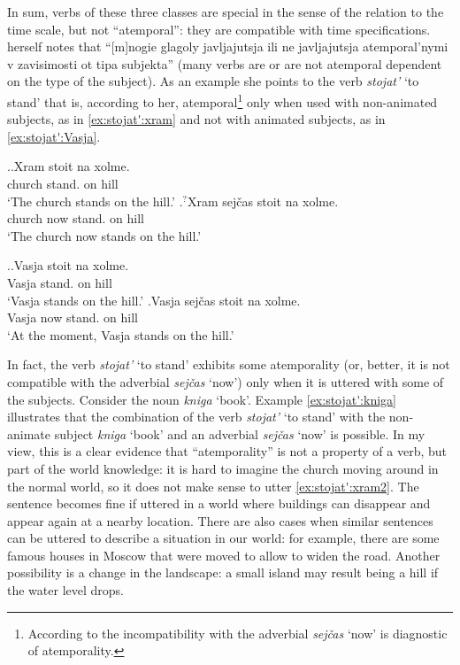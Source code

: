 In sum, verbs of these three classes are special in the sense of the relation to the time scale, but not ``atemporal'': they are compatible with time specifications. \citet[132]{Paducheva:96} herself notes that ``[m]nogie glagoly javljajutsja ili ne javljajutsja atemporal'nymi v zavisimosti ot tipa subjekta'' (many verbs are or are not atemporal dependent on the type of the subject). As an example she points to the verb \textit{stojat'} `to stand' that is, according to her, atemporal\footnote{According to \citet{Paducheva:96} the incompatibility with the adverbial \textit{sej\v{c}as} `now' is diagnostic of atemporality.} only when used with non-animated subjects, as in \ref{ex:stojat':xram} and not with animated subjects, as in \ref{ex:stojat':Vasja}.

\ex.\label{ex:stojat':xram}\ag.Xram stoit na xolme.\\
church stand. on hill\\
\vspace{0.5em}
`The church stands on the hill.'
\bg.\label{ex:stojat':xram2}$^?$Xram sej\v{c}as stoit na xolme.\\
church now stand. on hill\\
\vspace{0.5em}
`The church now stands on the hill.'

\ex.\label{ex:stojat':Vasja}\ag.Vasja stoit na xolme.\\
Vasja stand. on hill\\
\vspace{0.5em}
`Vasja stands on the hill.'
\bg.Vasja sej\v{c}as stoit na xolme.\\
Vasja now stand. on hill\\
\vspace{0.5em}
`At the moment, Vasja stands on the hill.'

In fact, the verb \textit{stojat'} `to stand' exhibits some atemporality (or, better, it is not compatible with the adverbial \textit{sej\v{c}as} `now') only when it is uttered with some of the subjects. Consider the noun \textit{kniga} `book'. Example \ref{ex:stojat':kniga} illustrates that the combination of the verb \textit{stojat'} `to stand' with the non-animate subject \textit{kniga} `book' and an adverbial \textit{sej\v{c}as} `now' is possible.  In my view, this is a clear evidence that ``atemporality'' is not a property of a verb, but part of the world knowledge: it is hard to imagine the church moving around in the normal world, so it does not make sense to utter \ref{ex:stojat':xram2}. The sentence becomes fine if uttered in a world where buildings can disappear and appear again at a nearby location. There are also cases when similar sentences can be uttered to describe a situation in our world: for example, there are some famous houses in Moscow that were moved to allow to widen the road. Another possibility is a change in the landscape: a small island may result being a hill if the water level drops. 

